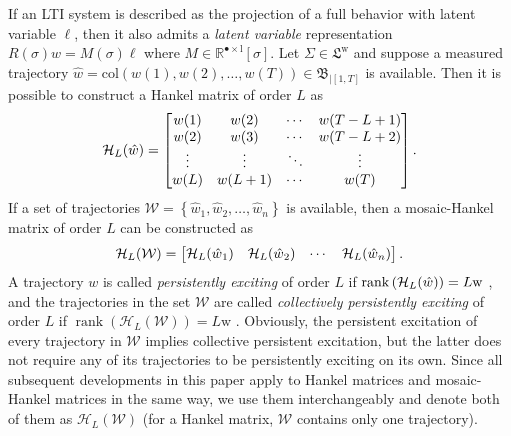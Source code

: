 \documentclass[11pt,print,draftcls,onecolumn,romanappendices]{ieeecolor}
\DeclareMathOperator{\rank}{rank}
\newcommand{\LTI}[1]{\mathfrak{L}^{#1}}
\newcommand{\revise}[1]{{\color{black} #1}}
\newcommand{\B}{\mathfrak{B}}
\newcommand{\Hk}{\mathcal{H}}
\begin{document}
If an LTI system is described as the projection of a full behavior with latent variable $\ell$, then it also admits a \emph{latent variable} representation $R(\sigma)w=M(\sigma)\ell$ where $M\in\mathbb{R}^{\bullet\times\mathrm{l}}[\sigma]$. Let $\Sigma\in\LTI{\mathrm{w}}$ and suppose a measured trajectory \revise{$\hat{w}=\mathrm{col}\left(w(1),w(2),\ldots,w(T)\right)\in\B_{|[1,T]}$} is available. Then it is possible to construct a Hankel matrix of order $L$ as
\revise{\begin{equation}\label{eq:Hankelmatrix}
	\Hk_L(\revise{\hat{w}})=\begin{bmatrix}
		w(1) & w(2) & \cdots & w(T-L+1)\\
		w(2) & w(3) & \cdots & w(T-L+2)\\
		\vdots & \vdots & \ddots & \vdots\\
		w(L) & w(L+1)&\cdots& w(T)
	\end{bmatrix}.
\end{equation}}
If a set of trajectories $\mathcal{W}=\left\{\hat{w}_1,\hat{w}_2,\ldots,\hat{w}_n\right\}$ is available, then a mosaic-Hankel matrix of order $L$ can be constructed as 
\begin{equation}\label{eq:mosaicHankelmatrix}
	\Hk_L(\mathcal{W})=\begin{bmatrix}
		\Hk_L(\revise{\hat{w}}_1) & \Hk_L(\revise{\hat{w}}_2) & \cdots & \Hk_L(\revise{\hat{w}}_n)
	\end{bmatrix}.
\end{equation}
A trajectory $w$ is called \emph{persistently exciting} of order $L$ if $\rank\left(\Hk_L(\revise{\hat{w}})\right)=L\mathrm{w}$ \cite{Willems:2005}, and the trajectories in the set $\mathcal{W}$ are called \emph{collectively persistently exciting} of order $L$ if $\rank\left(\Hk_L(\mathcal{W})\right)=L\mathrm{w}$ \cite{vanWaarde:2020}. Obviously, the persistent excitation of \revise{every} trajectory in $\mathcal{W}$ implies collective persistent excitation, but the latter does not require any of its trajectories to be persistently exciting on its own. Since all subsequent developments in this paper apply to Hankel matrices and mosaic-Hankel matrices in the same way, we use them interchangeably and denote both of them as \revise{$\Hk_L(\mathcal{W})$ (for a  Hankel matrix, $\mathcal{W}$ contains only one trajectory).}
\end{document}
